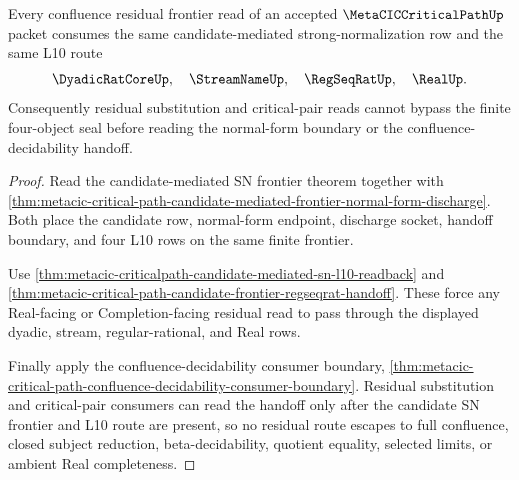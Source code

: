 \begin{theorem}
\label{thm:metacic-criticalpath-confluence-residual-frontier-route}
Every confluence residual frontier read of an accepted $\MetaCICCriticalPathUp$ packet consumes the same candidate-mediated strong-normalization row and the same L10 route
$$
\DyadicRatCoreUp,\quad
\StreamNameUp,\quad
\RegSeqRatUp,\quad
\RealUp .
$$
Consequently residual substitution and critical-pair reads cannot bypass the finite four-object seal before reading the normal-form boundary or the confluence-decidability handoff.
\end{theorem}
\begin{proof}
Read the candidate-mediated SN frontier theorem together with \autoref{thm:metacic-critical-path-candidate-mediated-frontier-normal-form-discharge}. Both place the candidate row, normal-form endpoint, discharge socket, handoff boundary, and four L10 rows on the same finite frontier.

Use \autoref{thm:metacic-criticalpath-candidate-mediated-sn-l10-readback} and \autoref{thm:metacic-critical-path-candidate-frontier-regseqrat-handoff}. These force any Real-facing or Completion-facing residual read to pass through the displayed dyadic, stream, regular-rational, and Real rows.

Finally apply the confluence-decidability consumer boundary, \autoref{thm:metacic-critical-path-confluence-decidability-consumer-boundary}. Residual substitution and critical-pair consumers can read the handoff only after the candidate SN frontier and L10 route are present, so no residual route escapes to full confluence, closed subject reduction, beta-decidability, quotient equality, selected limits, or ambient Real completeness.
\end{proof}

